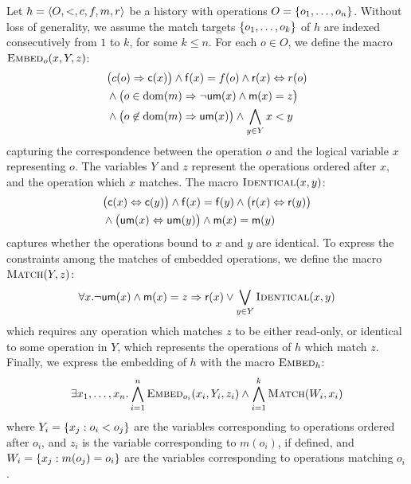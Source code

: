 Let $h = \tup{O,<,c,f,m,r}$ be a history with operations $O = \set{ o_1, \ldots,
o_n }$. Without loss of generality, we assume the match targets $\set{o_1,
\ldots, o_k}$ of $h$ are indexed consecutively from $1$ to $k$, for some $k \le
n$. For each $o \in O$, we define the macro $\textsc{Embed}_o(x,Y,z)$:
\begin{align*}
  & \big(c(o) \implies {\sf c}(x)\big) \land {\sf f}(x) = f(o) \land {\sf r}(x) \Leftrightarrow r(o) \\
  & \land \big(o \in \dom(m)
    \implies \lnot{\sf um}(x) \land {\sf m}(x) = z\big) \\
  & \land \big(o \not\in \dom(m) \implies {\sf um}(x)\big)
    \land \bigwedge_{y \in Y} x < y
\end{align*}
capturing the correspondence between the operation $o$ and the logical variable
$x$ representing $o$. The variables $Y$ and $z$ represent the operations
ordered after $x$, and the operation which $x$ matches. The macro
$\textsc{Identical}(x,y)$:
\begin{align*}
  & \big({\sf c}(x) \Leftrightarrow {\sf c}(y)\big)
    \land {\sf f}(x) = {\sf f}(y)
    \land \big({\sf r}(x) \Leftrightarrow {\sf r}(y)\big) \\
  & \land \big({\sf um}(x) \Leftrightarrow {\sf um}(y)\big)
    \land {\sf m}(x) = {\sf m}(y)
\end{align*}
captures whether the operations bound to $x$ and $y$ are identical.
To express the constraints among the matches of embedded operations, we define
the macro $\textsc{Match}(Y,z)$:
\begin{align*}
  \forall x.
  \lnot{\sf um}(x) \land
  {\sf m}(x) = z \implies
  {\sf r}(x) \lor \bigvee_{y \in Y} \textsc{Identical}(x,y)
\end{align*}
which requires any operation which matches $z$ to be either read-only, or
identical to some operation in $Y$, which represents the operations of $h$
which match $z$. Finally, we express the embedding of $h$ with the macro
$\textsc{Embed}_h$:
\begin{align*}
  \exists x_1, \ldots, x_n.
  \bigwedge_{i=1}^{n} \textsc{Embed}_{o_i}(x_i,Y_i,z_i)
  \land \bigwedge_{i=1}^{k} \textsc{Match}(W_i, x_i)
\end{align*}
where $Y_i = \set{ x_j : o_i < o_j }$ are the variables corresponding to
operations ordered after $o_i$, and $z_i$ is the variable corresponding to
$m(o_i)$, if defined, and $W_i = \set{ x_j : m(o_j) = o_i }$ are the variables
corresponding to operations matching $o_i$.

